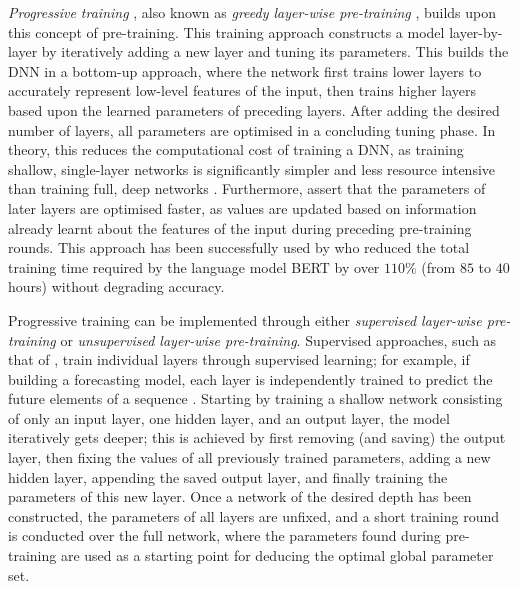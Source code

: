 \documentclass[a4paper, 11pt]{report}
\begin{document}
    \emph{Progressive training} \citep{xu-2021}, also known as \emph{greedy layer-wise pre-training} \citep{xu-2018}, builds upon this concept of pre-training. This training approach constructs a model layer-by-layer by iteratively adding a new layer and tuning its parameters. This builds the DNN in a bottom-up approach, where the network first trains lower layers to accurately represent low-level features of the input, then trains higher layers based upon the learned parameters of preceding layers. After adding the desired number of layers, all parameters are optimised in a concluding tuning phase. In theory, this reduces the computational cost of training a DNN, as training shallow, single-layer networks is significantly simpler and less resource intensive than training full, deep networks \citep{xu-2021}. Furthermore, \citet{xu-2021} assert that the parameters of later layers are optimised faster, as values are updated based on information already learnt about the features of the input during preceding pre-training rounds. This approach has been successfully used by \citet{yang-2020} who reduced the total training time required by the language model BERT by over $110\%$ (from $85$ to $40$ hours) without degrading accuracy.

    Progressive training can be implemented through either \emph{supervised layer-wise pre-training} or \emph{unsupervised layer-wise pre-training}. Supervised approaches, such as that of \citet{ienco-2019}, train individual layers through supervised learning; for example, if building a forecasting model, each layer is independently trained to predict the future elements of a sequence \citep{xu-2018}. Starting by training a shallow network consisting of only an input layer, one hidden layer, and an output layer, the model iteratively gets deeper; this is achieved by first removing (and saving) the output layer, then fixing the values of all previously trained parameters, adding a new hidden layer, appending the saved output layer, and finally training the parameters of this new layer. Once a network of the desired depth has been constructed, the parameters of all layers are unfixed, and a short training round is conducted over the full network, where the parameters found during pre-training are used as a starting point for deducing the optimal global parameter set. 
\end{document}
